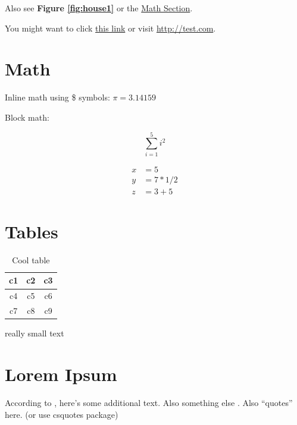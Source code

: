 \documentclass[10pt, letterpaper]{article}  %
\begin{document}
Also see \textbf{Figure \ref{fig:house1}} or the
\hyperref[sec:math]{Math Section}.

You might want to click \href{http://test.com}{this link} or visit \url{http://test.com}.



\section{Math}
\label{sec:math}

Inline math using \$ symbols: $\pi = 3.14159$

Block math:

\[
    \sum^{5}_{i=1} i^2
\]

\begin{align*}
    x &= 5 \\
    y &= 7 * 1 / 2 \\
    z &= 3 + 5
\end{align*}


\vspace{3in}
\section{Tables}

\begin{table}[h!]
\centering
\begin{tabular}{|c|c|c|}
    \hline
    c1 & c2 & c3 \\
    \hline
    c4 & c5 & c6 \\
    c7 & c8 & c9 \\
    \hline
\end{tabular}

\vspace{-0.3cm}
\caption{Cool table}
\end{table}

\begin{small}
    really small text
\end{small}









\section{Lorem Ipsum}
\lipsum[1-5]
According to \cite{Goodfellow_Goodfellow_Wilson_Hunt_2010}, here's some additional text. Also something else \citep{Szelogowski_2022}. Also ``quotes'' here. (or use csquotes package)





\pagebreak

\end{document}
